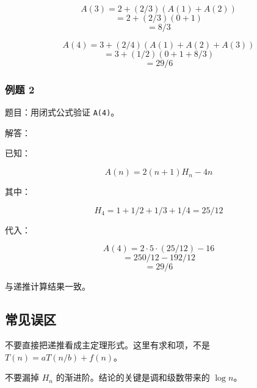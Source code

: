 \documentclass[UTF8,zihao=-4]{ctexart}
\begin{document}
\[A(3) = 2 + (2/3)(A(1) + A(2))\]
\[= 2 + (2/3)(0 + 1)\]
\[= 8/3\]

\[A(4) = 3 + (2/4)(A(1) + A(2) + A(3))\]
\[= 3 + (1/2)(0 + 1 + 8/3)\]
\[= 29/6\]

\subsubsection*{例题 2}

题目：用闭式公式验证 \texttt{A(4)}。

解答：

已知：

\[A(n) = 2(n + 1)H_{n} - 4n\]

其中：

\[H_{4} = 1 + 1/2 + 1/3 + 1/4 = 25/12\]

代入：

\[A(4) = 2\cdot 5\cdot (25/12) - 16\]
\[= 250/12 - 192/12\]
\[= 29/6\]

与递推计算结果一致。

\subsection*{常见误区}

不要直接把递推看成主定理形式。这里有求和项，不是 $T(n) = aT(n/b) + f(n)$。

不要漏掉 $H_n$ 的渐进阶。结论的关键是调和级数带来的 $\log n$。
\end{document}
